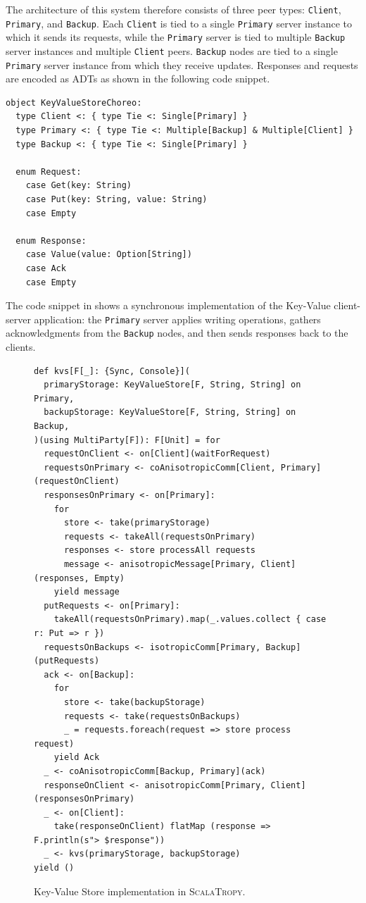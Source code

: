 \documentclass[runningheads]{llncs}
\newcommand{\ourLang}{\textsc{ScalaTropy}}
\newcommand{\code}[1]{\lstinline[style=scala3,basicstyle=\ttfamily\small\color{vscLightText}]{#1}}
\begin{document}
The architecture of this system therefore consists of three peer types: \code{Client}, \code{Primary}, and \code{Backup}.
%
Each \code{Client} is tied to a single \code{Primary} server instance to which it sends its requests,
while the \code{Primary} server is tied to multiple \code{Backup} server instances and multiple \code{Client} peers.
%
\code{Backup} nodes are tied to a single \code{Primary} server instance from which they receive updates.
%
Responses and requests are encoded as ADTs as shown in the following code snippet.

\begin{lstlisting}[style=scala3]
object KeyValueStoreChoreo:
  type Client <: { type Tie <: Single[Primary] }
  type Primary <: { type Tie <: Multiple[Backup] & Multiple[Client] }
  type Backup <: { type Tie <: Single[Primary] }

  enum Request:
    case Get(key: String)
    case Put(key: String, value: String)
    case Empty

  enum Response:
    case Value(value: Option[String])
    case Ack
    case Empty
\end{lstlisting}

The code snippet in  shows a synchronous implementation of the Key-Value client-server application: the \code{Primary} server applies writing operations, gathers acknowledgments from the \code{Backup} nodes, and then sends responses back to the clients.

\begin{figure}[t]
\begin{lstlisting}[style=scala3]
def kvs[F[_]: {Sync, Console}](
  primaryStorage: KeyValueStore[F, String, String] on Primary,
  backupStorage: KeyValueStore[F, String, String] on Backup,
)(using MultiParty[F]): F[Unit] = for
  requestOnClient <- on[Client](waitForRequest)
  requestsOnPrimary <- coAnisotropicComm[Client, Primary](requestOnClient)
  responsesOnPrimary <- on[Primary]:
    for
      store <- take(primaryStorage)
      requests <- takeAll(requestsOnPrimary)
      responses <- store processAll requests
      message <- anisotropicMessage[Primary, Client](responses, Empty)
    yield message
  putRequests <- on[Primary]:
    takeAll(requestsOnPrimary).map(_.values.collect { case r: Put => r })
  requestsOnBackups <- isotropicComm[Primary, Backup](putRequests)
  ack <- on[Backup]:
    for
      store <- take(backupStorage)
      requests <- take(requestsOnBackups)
      _ = requests.foreach(request => store process request)
    yield Ack
  _ <- coAnisotropicComm[Backup, Primary](ack)
  responseOnClient <- anisotropicComm[Primary, Client](responsesOnPrimary)
  _ <- on[Client]:
    take(responseOnClient) flatMap (response => F.println(s"> $response"))
  _ <- kvs(primaryStorage, backupStorage)
yield ()
\end{lstlisting}
\caption{Key-Value Store implementation in \ourLang{}.}
\label{fig:kvs}
\end{figure}
\end{document}
